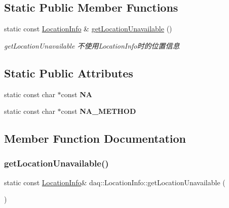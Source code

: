 \subsection*{Static Public Member Functions}
\begin{DoxyCompactItemize}
\item 
static const \hyperlink{classdaq_1_1LocationInfo}{Location\+Info} \& \hyperlink{classdaq_1_1LocationInfo_a3e1a9b86cb3b5f35accb70db5dc62ed4}{get\+Location\+Unavailable} ()
\begin{DoxyCompactList}\small\item\em get\+Location\+Unavailable 不使用\+Location\+Info时的位置信息 \end{DoxyCompactList}\end{DoxyCompactItemize}
\subsection*{Static Public Attributes}
\begin{DoxyCompactItemize}
\item 
\mbox{\label{classdaq_1_1LocationInfo_aea318a7eecc96e89ac2470810071111c}} 
static const char $\ast$const {\bfseries NA}
\item 
\mbox{\label{classdaq_1_1LocationInfo_a9a9d0810de543046a08104e5135b6e91}} 
static const char $\ast$const {\bfseries N\+A\+\_\+\+M\+E\+T\+H\+OD}
\end{DoxyCompactItemize}


\subsection{Member Function Documentation}
\mbox{\label{classdaq_1_1LocationInfo_a3e1a9b86cb3b5f35accb70db5dc62ed4}} 
\subsubsection{\texorpdfstring{get\+Location\+Unavailable()}{getLocationUnavailable()}}
{\footnotesize\ttfamily static const \hyperlink{classdaq_1_1LocationInfo}{Location\+Info}\& daq\+::\+Location\+Info\+::get\+Location\+Unavailable (\begin{DoxyParamCaption}{ }\end{DoxyParamCaption})\hspace{0.3cm}{\ttfamily [static]}}



